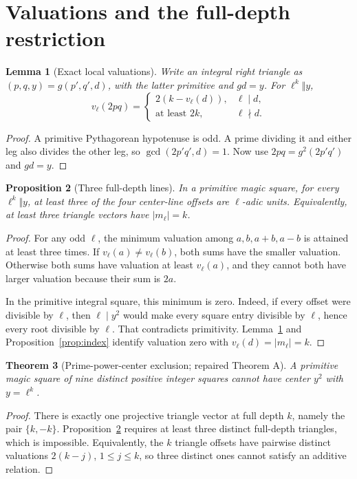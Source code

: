 \documentclass[11pt]{article}
\newtheorem{theorem}{Theorem}[section]
\newtheorem{proposition}[theorem]{Proposition}
\newtheorem{lemma}[theorem]{Lemma}
\theoremstyle{definition}\newtheorem{definition}[theorem]{Definition}
\theoremstyle{remark}\newtheorem{remark}[theorem]{Remark}
\begin{document}
\section{Valuations and the full-depth restriction}\label{sec:valuations}
\begin{lemma}[Exact local valuations]\label{lem:valuation}
Write an integral right triangle as $(p,q,y)=g(p',q',d)$, with the latter primitive and $gd=y$. For $\ell^k\Vert y$,
\[
v_\ell(2pq)=
\begin{cases}
2(k-v_\ell(d)),&\ell\mid d,\\
\text{at least }2k,&\ell\nmid d.
\end{cases}
\]
\end{lemma}
\begin{proof}
A primitive Pythagorean hypotenuse is odd. A prime dividing it and either leg also divides the other leg, so $\gcd(2p'q',d)=1$. Now use $2pq=g^2(2p'q')$ and $gd=y$.
\end{proof}

\begin{proposition}[Three full-depth lines]\label{prop:depth}
In a primitive magic square, for every $\ell^k\Vert y$, at least three of the four center-line offsets are $\ell$-adic units. Equivalently, at least three triangle vectors have $|m_\ell|=k$.
\end{proposition}
\begin{proof}
For any odd $\ell$, the minimum valuation among $a,b,a+b,a-b$ is attained at least three times. If $v_\ell(a)\ne v_\ell(b)$, both sums have the smaller valuation. Otherwise both sums have valuation at least $v_\ell(a)$, and they cannot both have larger valuation because their sum is $2a$.

In the primitive integral square, this minimum is zero. Indeed, if every offset were divisible by $\ell$, then $\ell\mid y^2$ would make every square entry divisible by $\ell$, hence every root divisible by $\ell$. That contradicts primitivity. Lemma~\ref{lem:valuation} and Proposition~\ref{prop:index} identify valuation zero with $v_\ell(d)=|m_\ell|=k$.
\end{proof}

\begin{theorem}[Prime-power-center exclusion; repaired Theorem A]\label{thm:A}
A primitive magic square of nine distinct positive integer squares cannot have center $y^2$ with $y=\ell^k$.
\end{theorem}
\begin{proof}
There is exactly one projective triangle vector at full depth $k$, namely the pair $\{k,-k\}$. Proposition~\ref{prop:depth} requires at least three distinct full-depth triangles, which is impossible. Equivalently, the $k$ triangle offsets have pairwise distinct valuations $2(k-j)$, $1\le j\le k$, so three distinct ones cannot satisfy an additive relation.
\end{proof}
\end{document}
